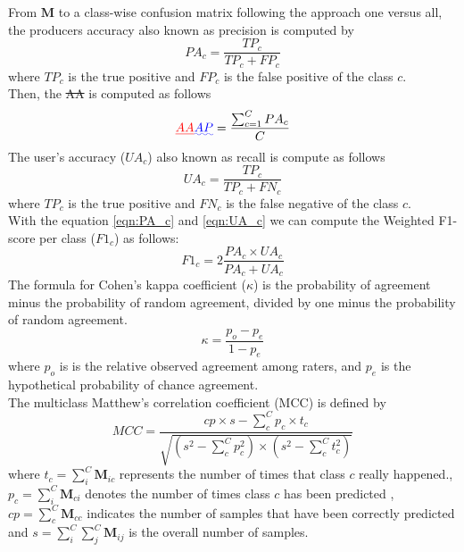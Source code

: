 \documentclass[journal,article,submit,pdftex,moreauthors]{Definitions/mdpi}
\providecommand{\DIFadd}[1]{{\protect\color{blue}\uwave{#1}}} %
\providecommand{\DIFdel}[1]{{\protect\color{red}\sout{#1}}}                      %
\providecommand{\DIFaddbegin}{} %
\providecommand{\DIFaddend}{} %
\providecommand{\DIFdelbegin}{} %
\providecommand{\DIFdelend}{} %
\begin{document}
From $\mathbf{M}$ to a class-wise confusion matrix following the approach one versus all, the producers accuracy also known as precision is computed by \\
\begin{equation}
	\label{eqn:PA_c}
	PA_c = \frac{TP_c}{TP_c + FP_c}
\end{equation}
where $TP_c$ is the true positive and $FP_c$ is the false positive of the class $c$. \\
Then, the \DIFdelbegin \DIFdel{AA }\DIFdelend \DIFaddbegin \DIFadd{$AP$ }\DIFaddend is computed as follows
\begin{equation}
	\label{eqn:AA}
	\DIFdelbegin \DIFdel{AA }\DIFdelend \DIFaddbegin \DIFadd{AP }\DIFaddend = \frac{\sum_{c=1}^{C} PA_c}{C}
\end{equation}
The user's accuracy ($UA_c$) also known as recall is compute as follows
\begin{equation}
	\label{eqn:UA_c}
	UA_c = \frac{TP_c}{TP_c + FN_c}
\end{equation}
where $TP_c$ is the true positive and $FN_c$ is the false negative of the class $c$.\\
With the equation \ref{eqn:PA_c} and \ref{eqn:UA_c} we can compute the Weighted F1-score per class ($F1_c$) as follows:
\begin{equation}
	\label{eqn:F1_c}
	F1_c = 2 \frac{PA_c \times UA_c}{PA_c + UA_c}
\end{equation}
The formula for Cohen’s kappa coefficient ($\kappa$) is the probability of agreement minus the probability of random agreement, divided by one minus the probability of random agreement.\\
\begin{equation}
	\label{eqn:k}
	\kappa= \frac{p_o - p_e}{1 - p_e}
\end{equation}
where $p_o$ is is the relative observed agreement among raters, and $p_e$ is the hypothetical probability of chance agreement.\\
The multiclass Matthew's correlation coefficient (MCC) is defined by
\begin{equation}
    MCC = \frac{cp \times s - \sum^{C}_{c} p_{c} \times t_{c} }{\sqrt{( s^{2} - \sum^{C}_{c} p^{2}_{c}) \times (s^{2} - \sum^{C}_{c} t^{2}_{c})}}
\end{equation}
where $t_{c} = \sum^{C}_{i} \mathbf{M}_{ic}$ represents the number of times that class $c$ really happened., $p_{c} = \sum^{C}_{i} \mathbf{M}_{ci}$ denotes the number of times class $c$ has been predicted , $cp = \sum^{C}_{c} \mathbf{M}_{cc}$ indicates the number of samples that have been correctly predicted and $s= \sum^{C}_{i} \sum^{C}_{j} \mathbf{M}_{ij}$ is the overall number of samples.
\end{document}
